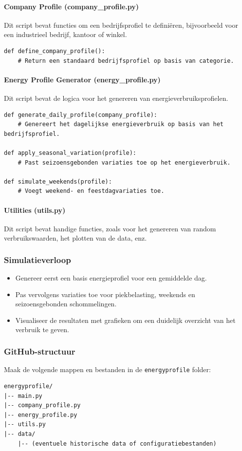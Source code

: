 \documentclass[../main.tex]{subfiles}
\begin{document}
\paragraph{Company Profile (company\_profile.py)} Dit script bevat functies om een bedrijfsprofiel te definiëren, bijvoorbeeld voor een industrieel bedrijf, kantoor of winkel.
\begin{verbatim}
def define_company_profile():
    # Return een standaard bedrijfsprofiel op basis van categorie.
\end{verbatim}

\paragraph{Energy Profile Generator (energy\_profile.py)} Dit script bevat de logica voor het genereren van energieverbruiksprofielen.
\begin{verbatim}
def generate_daily_profile(company_profile):
    # Genereert het dagelijkse energieverbruik op basis van het bedrijfsprofiel.

def apply_seasonal_variation(profile):
    # Past seizoensgebonden variaties toe op het energieverbruik.

def simulate_weekends(profile):
    # Voegt weekend- en feestdagvariaties toe.
\end{verbatim}

\paragraph{Utilities (utils.py)} Dit script bevat handige functies, zoals voor het genereren van random verbruikswaarden, het plotten van de data, enz.

\subsubsection{Simulatieverloop}
\begin{itemize}
    \item Genereer eerst een basis energieprofiel voor een gemiddelde dag.
    \item Pas vervolgens variaties toe voor piekbelasting, weekends en seizoensgebonden schommelingen.
    \item Visualiseer de resultaten met grafieken om een duidelijk overzicht van het verbruik te geven.
\end{itemize}

\subsubsection{GitHub-structuur}
Maak de volgende mappen en bestanden in de \texttt{energyprofile} folder:
\begin{verbatim}
energyprofile/
|-- main.py
|-- company_profile.py
|-- energy_profile.py
|-- utils.py
|-- data/
    |-- (eventuele historische data of configuratiebestanden)
\end{verbatim}
\end{document}
